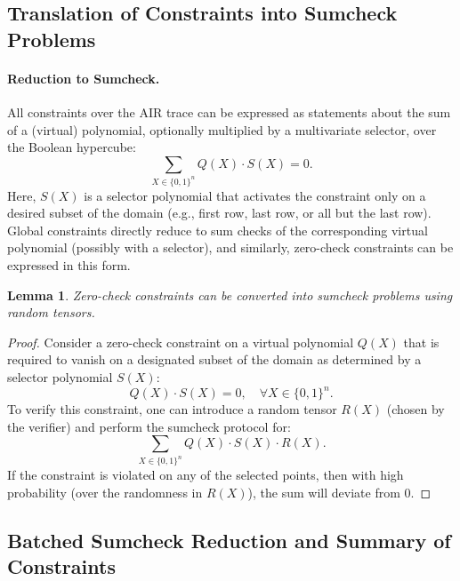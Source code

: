 \documentclass{article}
\newtheorem{lemma}{Lemma}
\begin{document}
\subsection{Translation of Constraints into Sumcheck Problems}

\paragraph{Reduction to Sumcheck.}  
All constraints over the AIR trace can be expressed as statements about the sum of a (virtual) polynomial, optionally multiplied by a multivariate selector, over the Boolean hypercube:
\[
\sum_{X \in \{0, 1\}^n} Q(X) \cdot S(X) = 0.
\]
Here, \( S(X) \) is a selector polynomial that activates the constraint only on a desired subset of the domain (e.g., first row, last row, or all but the last row). Global constraints directly reduce to sum checks of the corresponding virtual polynomial (possibly with a selector), and similarly, zero-check constraints can be expressed in this form.

\begin{lemma}
Zero-check constraints can be converted into sumcheck problems using random tensors.
\end{lemma}

\begin{proof}
Consider a zero-check constraint on a virtual polynomial \( Q(X) \) that is required to vanish on a designated subset of the domain as determined by a selector polynomial \( S(X) \):
\[
Q(X) \cdot S(X) = 0, \quad \forall X \in \{0, 1\}^n.
\]
To verify this constraint, one can introduce a random tensor \( R(X) \) (chosen by the verifier) and perform the sumcheck protocol for:
\[
\sum_{X \in \{0, 1\}^n} Q(X) \cdot S(X) \cdot R(X).
\]
If the constraint is violated on any of the selected points, then with high probability (over the randomness in \( R(X) \)), the sum will deviate from 0.
\end{proof}

\subsection{Batched Sumcheck Reduction and Summary of Constraints}
\end{document}
